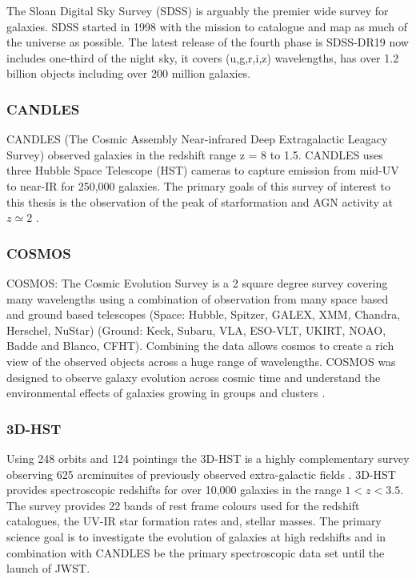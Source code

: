 The Sloan Digital Sky Survey (SDSS) is arguably the premier wide survey for galaxies. SDSS started in 1998 with the mission to catalogue and map as much of the universe as possible. The latest release of the fourth phase is SDSS-DR19 \citep{Ahumada2019TheSpectra} now includes one-third of the night sky, it covers (u,g,r,i,z) wavelengths, has over 1.2 billion objects including over 200 million galaxies.

\subsubsection{CANDLES}
CANDLES (The Cosmic Assembly Near-infrared Deep Extragalactic Leagacy Survey) observed galaxies in the redshift range z = 8 to 1.5. CANDLES uses three Hubble Space Telescope (HST) cameras to capture emission from mid-UV to near-IR for 250,000 galaxies. The primary goals of this survey of interest to this thesis is the observation of the peak of starformation and AGN activity at $z \simeq 2$ \cite{Grogin2011Candels:Survey}.

\subsubsection{COSMOS}

COSMOS: The Cosmic Evolution Survey is a 2 square degree survey covering many wavelengths using a combination of observation from many space based and ground based telescopes (Space: Hubble, Spitzer, GALEX, XMM, Chandra, Herschel, NuStar) (Ground: Keck, Subaru, VLA, ESO-VLT, UKIRT, NOAO, Badde and Blanco, CFHT). Combining the data allows cosmos to create a rich view of the observed objects across a huge range of wavelengths. COSMOS was designed to observe galaxy evolution across cosmic time and understand the environmental effects of galaxies growing in groups and clusters \citep{HomeCOSMOS}.

\subsubsection{3D-HST}

Using 248 orbits and 124 pointings the 3D-HST is a highly complementary survey observing 625 arcminuites of previously observed extra-galactic fields \citep{Brammer20123D-HST:Telescope}. 3D-HST provides spectroscopic redshifts for over 10,000 galaxies in the range $1 < z < 3.5$. The survey provides 22 bands of rest frame colours used for the redshift catalogues, the UV-IR star formation rates and, stellar masses. The primary science goal is to investigate the evolution of galaxies at high redshifts and in combination with CANDLES be the primary spectroscopic data set until the launch of JWST.

